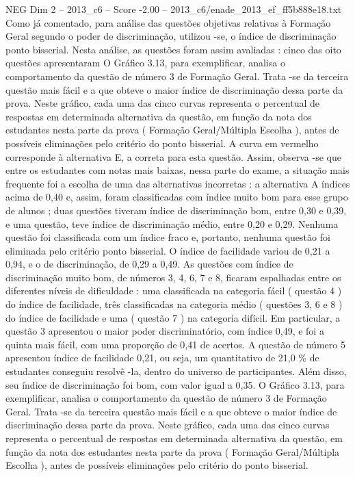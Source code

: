 \begin{textsample}{NEG Dim 2 – 2013\_c6 – Score -2.00 – 2013\_c6/enade\_2013\_ef\_ff5b888e18.txt}
Como já comentado, para análise das questões objetivas relativas à Formação Geral segundo o poder de discriminação, utilizou -se, o índice de discriminação ponto bisserial.
Nesta análise, as questões foram assim avaliadas : cinco das oito questões apresentaram O Gráfico 3.13, para exemplificar, analisa o comportamento da questão de número 3 de Formação Geral.
Trata -se da terceira questão mais fácil e a que obteve o maior índice de discriminação dessa parte da prova.
Neste gráfico, cada uma das cinco curvas representa o percentual de respostas em determinada alternativa da questão, em função da nota dos estudantes nesta parte da prova ( Formação Geral/Múltipla Escolha ), antes de possíveis eliminações pelo critério do ponto bisserial.
A curva em vermelho corresponde à alternativa E, a correta para esta questão.
Assim, observa -se que entre os estudantes com notas mais baixas, nessa parte do exame, a situação mais frequente foi a escolha de uma das alternativas incorretas : a alternativa A índices acima de 0,40 e, assim, foram classificadas com índice muito bom para esse grupo de alunos ; duas questões tiveram índice de discriminação bom, entre 0,30 e 0,39, e uma questão, teve índice de discriminação médio, entre 0,20 e 0,29.
Nenhuma questão foi classificada com um índice fraco e, portanto, nenhuma questão foi eliminada pelo critério ponto bisserial.
O índice de facilidade variou de 0,21 a 0,94, e o de discriminação, de 0,29 a 0,49.
As questões com índice de discriminação muito bom, de números 3, 4, 6, 7 e 8, ficaram espalhadas entre os diferentes níveis de dificuldade : uma classificada na categoria fácil ( questão 4 ) do índice de facilidade, três classificadas na categoria médio ( questões 3, 6 e 8 ) do índice de facilidade e uma ( questão 7 ) na categoria difícil.
Em particular, a questão 3 apresentou o maior poder discriminatório, com índice 0,49, e foi a quinta mais fácil, com uma proporção de 0,41 de acertos.
A questão de número 5 apresentou índice de facilidade 0,21, ou seja, um quantitativo de 21,0 \% de estudantes conseguiu resolvê -la, dentro do universo de participantes.
Além disso, seu índice de discriminação foi bom, com valor igual a 0,35.
O Gráfico 3.13, para exemplificar, analisa o comportamento da questão de número 3 de Formação Geral.
Trata -se da terceira questão mais fácil e a que obteve o maior índice de discriminação dessa parte da prova.
Neste gráfico, cada uma das cinco curvas representa o percentual de respostas em determinada alternativa da questão, em função da nota dos estudantes nesta parte da prova ( Formação Geral/Múltipla Escolha ), antes de possíveis eliminações pelo critério do ponto bisserial.

\end{textsample}
